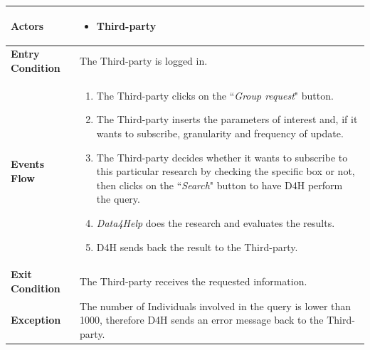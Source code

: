             \begin{table}[H]
            	\centering
                \begin{tabular}{|p{3cm}|p{8.2cm}|}
                    \hline
                    \textbf{Actors} &  \begin{itemize}
                        \item Third-party
                    \end{itemize} \\
                     \hline
                    \textbf{Entry Condition} & The Third-party is logged in. \\
                     \hline
                    \textbf{Events Flow} & \begin{enumerate}
                        \item The Third-party clicks on the ``\emph{Group request}" button.
                        \item The Third-party inserts the parameters of interest  and, if it wants to subscribe, granularity and frequency of update.
                        \item The Third-party decides whether it wants to subscribe to this particular research by checking the specific box or not, then clicks on the ``\emph{Search}" button to have D4H perform the query.
                        \item \emph{Data4Help} does the research and evaluates the results.
                        \item D4H sends back the result to the Third-party.
                    \end{enumerate} \\
                     \hline
                    \textbf{Exit Condition} & The Third-party receives the requested information. \\
                     \hline
                    \textbf{Exception} & The number of Individuals involved in the query is lower                        than 1000, therefore D4H sends an error message back to the                      Third-party. \\
                     \hline
                \end{tabular}  
            \end{table}
            
